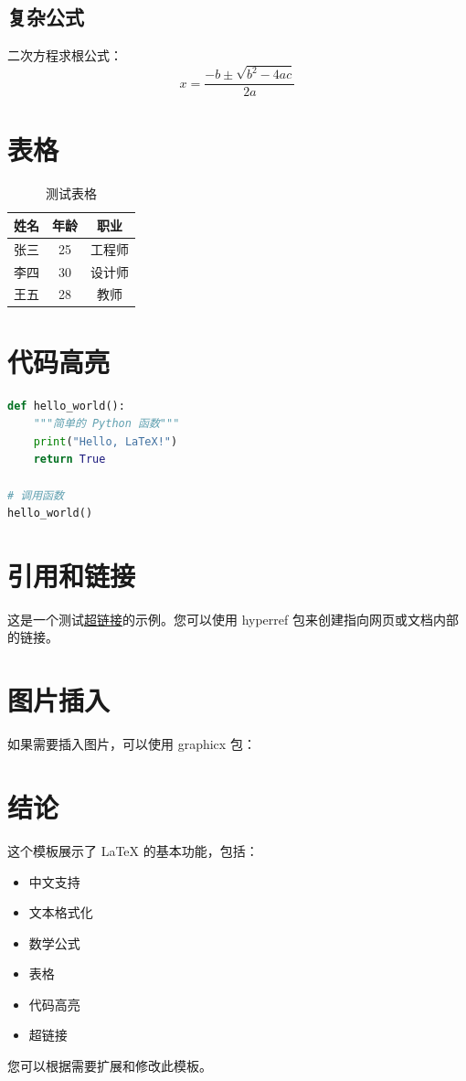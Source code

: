 \documentclass{article}
\begin{document}
\subsection{复杂公式}
二次方程求根公式：
\[
x = \frac{-b \pm \sqrt{b^2 - 4ac}}{2a}
\]

\section{表格}

\begin{table}[h]
    \centering
    \caption{测试表格}
    \begin{tabular}{|c|c|c|}
        \hline
        \textbf{姓名} & \textbf{年龄} & \textbf{职业} \\
        \hline
        张三 & 25 & 工程师 \\
        \hline
        李四 & 30 & 设计师 \\
        \hline
        王五 & 28 & 教师 \\
        \hline
    \end{tabular}
\end{table}

\section{代码高亮}

\begin{lstlisting}[language=Python]
def hello_world():
    """简单的 Python 函数"""
    print("Hello, LaTeX!")
    return True

# 调用函数
hello_world()
\end{lstlisting}

\section{引用和链接}

这是一个测试\href{https://www.example.com}{超链接}的示例。您可以使用 hyperref 包来创建指向网页或文档内部的链接。

\section{图片插入}

如果需要插入图片，可以使用 graphicx 包：
\begin{center}
\end{center}

\section*{结论}

这个模板展示了 LaTeX 的基本功能，包括：
\begin{itemize}
    \item 中文支持
    \item 文本格式化
    \item 数学公式
    \item 表格
    \item 代码高亮
    \item 超链接
\end{itemize}

您可以根据需要扩展和修改此模板。
\end{document}
